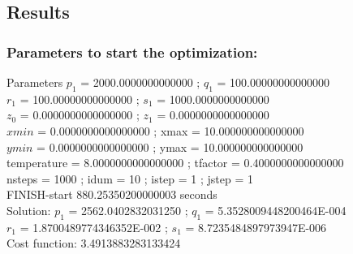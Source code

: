 \documentclass{beamer}
\begin{document}
\subsection{Results}
\begin{frame}
\frametitle{Parameters to start the optimization: \\}

\begin{block}{Parameters}
 $p_1$ =    2000.0000000000000  ;   $q_1$ =    100.00000000000000     \\
 $r_1$ =    100.00000000000000   ;   $s_1$ =    1000.0000000000000     \\
 $z_0$ =    0.0000000000000000   ;   $z_1$ =    0.0000000000000000     \\
 $xmin$ =    0.0000000000000000   ;    xmax =    10.000000000000000     \\
 $ymin$ =    0.0000000000000000   ;    ymax =    10.000000000000000     \\
 temperature =   8.0000000000000000    ;  tfactor =  0.4000000000000000  \\
 nsteps =        1000   ;  idum =  10 ;  istep =    1  ;  jstep =  1    \\
 FINISH-start   880.25350200000003 seconds   \\   
 Solution:
$p_1$ =    2562.0402832031250  ; $q_1$ =    5.3528009448200464E-004    \\ 
$r_1$ =    1.8700489774346352E-002   ; $s_1$ =    8.7235484897973947E-006 \\
Cost function: 3.4913883283133424
\end{block}
\end{frame}

\end{document}
